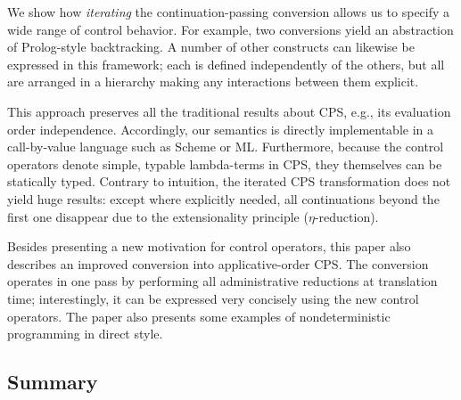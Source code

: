\documentclass[letterpaper]{llncs}
\begin{document}
We show how \textit{iterating} the continuation-passing conversion allows us to specify a wide range of control behavior. For example, two conversions yield an abstraction of Prolog-style backtracking. A number of other constructs can likewise be expressed in this framework; each is defined independently of the others, but all are arranged in a hierarchy making any interactions between them explicit. 

This approach preserves all the traditional results about CPS, e.g., its evaluation order independence. Accordingly, our semantics is directly implementable in a call-by-value language such as Scheme or ML. Furthermore, because the control operators denote simple, typable lambda-terms in CPS, they themselves can be statically typed. Contrary to intuition, the iterated CPS transformation does not yield huge results: except where explicitly needed, all continuations beyond the first one disappear due to the extensionality principle ($\eta$-reduction). 

Besides presenting a new motivation for control operators, this paper also describes an improved conversion into applicative-order CPS. The conversion operates in one pass by performing all administrative reductions at translation time; interestingly, it can be expressed very concisely using the new control operators. The paper also presents some examples of nondeterministic programming in direct style.  


\subsection*{Summary}
\end{document}

